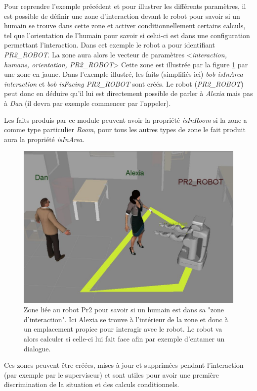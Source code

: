\documentclass[a4paper,11pt,twoside]{StyleThese}
\begin{document}
Pour reprendre l'exemple précédent et pour illustrer les différents paramètres, il est possible de définir une zone d'interaction devant le robot pour savoir si un humain se trouve dans cette zone et activer conditionnellement certains calculs, tel que l'orientation de l'humain pour savoir si celui-ci est dans une configuration permettant l'interaction.
Dans cet exemple le robot a pour identifiant \textit{PR2\_ROBOT}. La zone aura alors le vecteur de paramètres <\textit{interaction, humans, orientation, PR2\_ROBOT}>
Cette zone est illustrée par la figure \ref{fig:interaction} par une zone en jaune.
Dans l'exemple illustré, les faits (simplifiés ici) \textit{bob isInArea interaction} et \textit{bob isFacing PR2\_ROBOT} sont créés. Le robot (\textit{PR2\_ROBOT}) peut donc en déduire qu'il lui est directement possible de parler à \textit{Alexia} mais pas à \textit{Dan} (il devra par exemple commencer par l'appeler).

Les faits produis par ce module peuvent avoir la propriété \textit{isInRoom} si la zone a comme type particulier \textit{Room}, pour tous les autres types de zone le fait produit aura la propriété \textit{isInArea}.


\begin{figure}[ht!]
 \centering
  \includegraphics[width=0.69\linewidth]{./img/interactionarea.jpg} 
    \caption {Zone liée au robot Pr2 pour savoir si un humain est dans sa "zone d'interaction". Ici Alexia se trouve à l'intérieur de la zone et donc à un emplacement propice pour interagir avec le robot. Le robot va alors calculer si celle-ci lui fait face afin par exemple d'entamer un dialogue.}
  \label{fig:interaction}
\end{figure}

Ces zones peuvent être créées, mises à jour et supprimées pendant l'interaction (par exemple par le superviseur) et sont utiles pour avoir une première discrimination de la situation et des calculs conditionnels.
\end{document}
